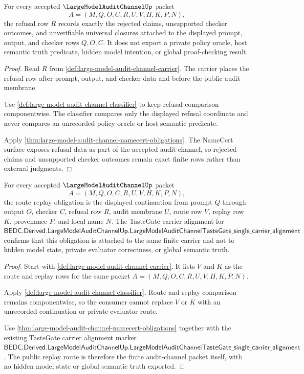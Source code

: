 \begin{theorem}
\label{thm:large-model-audit-channel-refusal-exactness-obligation}
For every accepted $\LargeModelAuditChannelUp$ packet
$$
A=(M,Q,O,C,R,U,V,H,K,P,N),
$$
the refusal row $R$ records exactly the rejected claims, unsupported checker outcomes, and unverifiable universal closures attached to the displayed prompt, output, and checker rows $Q,O,C$. It does not export a private policy oracle, host semantic truth predicate, hidden model intention, or global proof-checking result.
\end{theorem}
\begin{proof}
Read $R$ from \autoref{def:large-model-audit-channel-carrier}. The carrier places the refusal row after prompt, output, and checker data and before the public audit membrane.

Use \autoref{def:large-model-audit-channel-classifier} to keep refusal comparison componentwise. The classifier compares only the displayed refusal coordinate and never compares an unrecorded policy oracle or host semantic predicate.

Apply \autoref{thm:large-model-audit-channel-namecert-obligations}. The NameCert surface exposes refusal data as part of the accepted audit channel, so rejected claims and unsupported checker outcomes remain exact finite rows rather than external judgments.
\end{proof}

\begin{theorem}
\label{thm:large-model-audit-channel-route-replay-obligation}
For every accepted $\LargeModelAuditChannelUp$ packet
$$
A=(M,Q,O,C,R,U,V,H,K,P,N),
$$
the route replay obligation is the displayed continuation from prompt $Q$ through output $O$, checker $C$, refusal row $R$, audit membrane $U$, route row $V$, replay row $K$, provenance $P$, and local name $N$. The TasteGate carrier alignment for $\mathsf{BEDC.Derived.LargeModelAuditChannelUp.LargeModelAuditChannelTasteGate\_single\_carrier\_alignment}$ confirms that this obligation is attached to the same finite carrier and not to hidden model state, private evaluator correctness, or global semantic truth.
\end{theorem}
\begin{proof}
Start with \autoref{def:large-model-audit-channel-carrier}. It lists $V$ and $K$ as the route and replay rows for the same packet $A=(M,Q,O,C,R,U,V,H,K,P,N)$.

Apply \autoref{def:large-model-audit-channel-classifier}. Route and replay comparison remains componentwise, so the consumer cannot replace $V$ or $K$ with an unrecorded continuation or private evaluator route.

Use \autoref{thm:large-model-audit-channel-namecert-obligations} together with the existing TasteGate carrier alignment marker $\mathsf{BEDC.Derived.LargeModelAuditChannelUp.LargeModelAuditChannelTasteGate\_single\_carrier\_alignment}$. The public replay route is therefore the finite audit-channel packet itself, with no hidden model state or global semantic truth exported.
\end{proof}

